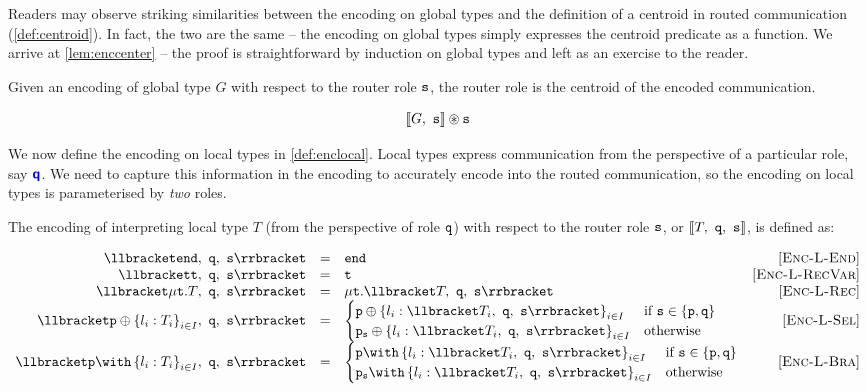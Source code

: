 Readers may observe striking similarities between
the encoding on global types and the definition of a
centroid in routed communication (\cref{def:centroid}).
In fact, the two are the same -- the encoding on global
types simply expresses the centroid predicate as a function.
We arrive at \cref{lem:enccenter} -- the proof is straightforward
by induction on global types and left as an exercise to the reader.

\begin{lemma}
Given an encoding of global type $G$ with respect to the
router role ${\mathtt{s}}$,
the router role is the centroid of the encoded communication.

\[
{\llbracket {G},~{\mathtt{s}} \rrbracket} \circledast {\mathtt{s}}
\]

\label{lem:enccenter}
\end{lemma}

We now define the encoding on local types in \cref{def:enclocal}.
Local types express communication from the perspective of a 
particular role, say ${\color{blue}\bm{\mathsf{q}}}$. 
We need to capture this information in the encoding
to accurately encode into the routed communication,
so the encoding on local types is parameterised by
\textit{two} roles.

\begin{definition}
The encoding of interpreting local type $T$ (from the
perspective of role ${\mathtt{q}}$) with respect to
the router role ${\mathtt{s}}$, or $\llbracket {T},~{\mathtt{q}},~{\mathtt{s}} \rrbracket$, is defined as:

\doublespacing
\[
\begin{array}{rclr}
\enclocal{\tend}{q}{s} &= & \tend & \rulename{Enc-L-End} \\
\enclocal{\trecvar}{q}{s} &= & \trecvar & \rulename{Enc-L-RecVar} \\
\enclocal{\trec{T}}{q}{s} &= & \trec{\enclocal{T}{q}{s}} 
	& \rulename{Enc-L-Rec} \\
\enclocal{\tsel{p}{l_i: T_i}{i\in I}}{q}{s} &= 
	& \begin{cases}
	\tsel{p}{l_i: \enclocal{T_i}{q}{s}}{i\in I}
		& \text{if } \mrole{s} \in \{ \mrole{p}, \mrole{q} \} \\
	\tselproxy{p}{s}{l_i: \enclocal{T_i}{q}{s}}{i\in I}
		& \text{otherwise} \\	
	\end{cases}
	& \rulename{Enc-L-Sel} \\
\enclocal{\tbra{p}{l_i: T_i}{i\in I}}{q}{s} &= 
	& \begin{cases}
	\tbra{p}{l_i: \enclocal{T_i}{q}{s}}{i\in I}
		& \text{if } \mrole{s} \in \{ \mrole{p}, \mrole{q} \} \\
	\tbraproxy{p}{s}{l_i: \enclocal{T_i}{q}{s}}{i\in I}
		& \text{otherwise} \\	
	\end{cases}
	& \rulename{Enc-L-Bra} \\
\end{array}
\]
\singlespacing

\label{def:enclocal}
\end{definition}

